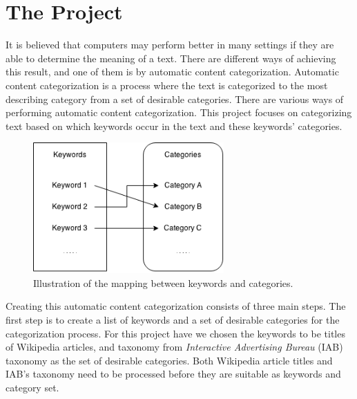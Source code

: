 \section{The Project}
It is believed that computers may perform better in many settings if they are able to determine the meaning of a text. There are different ways of achieving this result, and one of them is by automatic content categorization. Automatic content categorization is a process where the text is categorized to the most describing category from a set of desirable categories. There are various ways of performing automatic content categorization. This project focuses on categorizing text based on which keywords occur in the text and these keywords' categories. 

\begin{figure}[h]
\centering
\includegraphics[width=0.65\textwidth]{Chapters/Introduction/keywordstocategories}
\caption{Illustration of the mapping between keywords and categories.}
\label{fig:keywordstocategories}
\end{figure}


Creating this automatic content categorization consists of three main steps. The first step is to create a list of keywords and a set of desirable categories for the categorization process. For this project have we chosen the keywords to be titles of Wikipedia articles, and taxonomy from  \emph{Interactive Advertising Bureau} (IAB) taxonomy as the set of desirable categories. 
Both Wikipedia article titles and IAB's taxonomy need to be processed before they are suitable as keywords and category set. 

